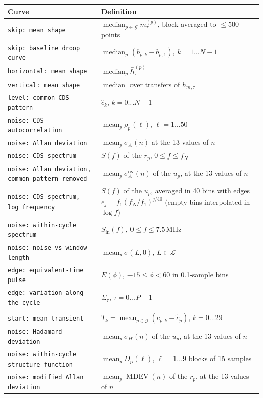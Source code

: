 \documentclass[10pt]{article}
\newcommand{\code}[1]{\texttt{#1}}
\newcommand{\med}{\operatorname*{median}}
\newcommand{\mean}{\operatorname*{mean}}
\newcommand{\G}{\mathcal G}
\begin{document}
\begin{longtable}{>{\raggedright\arraybackslash}p{}>{\raggedright\arraybackslash}p{}}
\toprule
Curve & Definition \\
\midrule
\endhead
\code{skip: mean shape} & $\med_{p \in \G} m^{(p)}_\tau$, block-averaged to $\le 500$ points \\
\code{skip: baseline droop curve} & $\med_p (b_{p,k} - b_{p,1})$, $k = 1 \dots N - 1$ \\
\code{horizontal: mean shape} & $\med_p \bar h^{(p)}_\tau$ \\
\code{vertical: mean shape} & $\med$ over transfers of $h_{m,\tau}$ \\
\code{level: common CDS pattern} & $\hat c_k$, $k = 0 \dots N-1$ \\
\code{noise: CDS autocorrelation} & $\mean_p \rho_p(\ell)$, $\ell = 1 \dots 50$ \\
\code{noise: Allan deviation} & $\mean_p \sigma_A(n)$ at the 13 values of $n$ \\
\code{noise: CDS spectrum} & $S(f)$ of the $r_p$, $0 \le f \le f_N$ \\
\code{noise: Allan deviation, common pattern removed} & $\mean_p \sigma^\text{ov}_A(n)$ of the $u_p$, at the 13 values of $n$ \\
\code{noise: CDS spectrum, log frequency} & $S(f)$ of the $u_p$, averaged in 40 bins with edges $e_j = f_1 (f_N/f_1)^{j/40}$ (empty bins
  interpolated in $\log f$) \\
\code{noise: within-cycle spectrum} & $S_\text{in}(f)$, $0 \le f \le 7.5$\,MHz \\
\code{noise: noise vs window length} & $\mean_p \sigma(L, 0)$, $L \in \mathcal L$ \\
\code{edge: equivalent-time pulse} & $E(\phi)$, $-15 \le \phi < 60$ in 0.1-sample bins \\
\code{edge: variation along the cycle} & $\Sigma_\tau$, $\tau = 0 \dots P-1$ \\
\midrule
\multicolumn{2}{l}{\emph{added 2026-10-21 (Section~\ref{sec:extra})}} \\
\code{start: mean transient} & $T_k = \mean_{p\in\G}(c_{p,k} - \tilde c_p)$, $k = 0 \dots 29$ \\
\code{noise: Hadamard deviation} & $\mean_p\sigma_H(n)$ of the $u_p$, at the 13 values of $n$ \\
\code{noise: within-cycle structure function} & $\mean_p D_p(\ell)$, $\ell = 1\dots9$ blocks of 15 samples \\
\code{noise: modified Allan deviation} & $\mean_p\operatorname{MDEV}(n)$ of the $r_p$, at the 13 values of $n$ \\
\bottomrule
\end{longtable}
\end{document}
